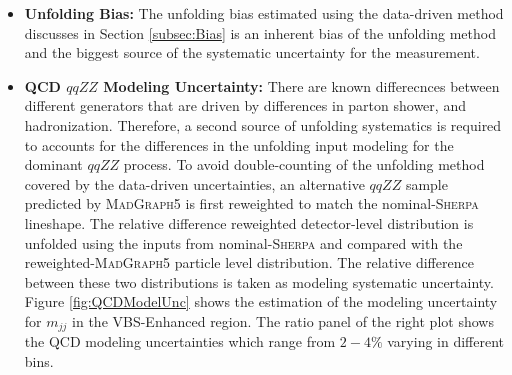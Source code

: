\begin{itemize}
    \item{\textbf{Unfolding Bias:} The unfolding bias estimated using the data-driven method discusses in Section \ref{subsec:Bias} is an inherent bias of the unfolding method and the biggest source of the systematic uncertainty for the measurement.
    }

    \item{\textbf{QCD $qqZZ$ Modeling Uncertainty:} There are known differecnces between different generators that are driven by differences in parton shower, and hadronization. Therefore, a second source of unfolding systematics is required to accounts for the differences in the unfolding input modeling for the dominant $qqZZ$ process. To avoid double-counting of the unfolding method covered by the data-driven uncertainties, an alternative $qqZZ$ sample predicted by \textsc{MadGraph5} is first reweighted to match the nominal-\textsc{Sherpa} lineshape. The relative difference reweighted detector-level distribution is unfolded using the inputs from nominal-\textsc{Sherpa} and compared with the reweighted-\textsc{MadGraph5} particle level distribution. The relative difference between these two distributions is taken as modeling systematic uncertainty. Figure \ref{fig:QCDModelUnc} shows the estimation of the modeling uncertainty for $m_{jj}$ in the VBS-Enhanced region. The ratio panel of the right plot shows the QCD modeling uncertainties which range from $2-4\%$ varying in different bins.
    
}
\end{itemize}
